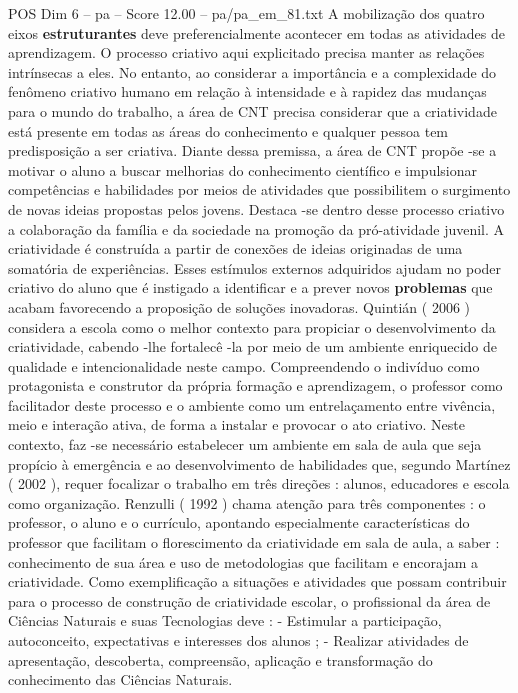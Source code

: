 \begin{textsample}{POS Dim 6 – pa – Score 12.00 – pa/pa\_em\_81.txt}
A mobilização dos quatro eixos \textbf{estruturantes} deve preferencialmente acontecer em todas as atividades de aprendizagem.
O processo criativo aqui explicitado precisa manter as relações intrínsecas a eles.
No entanto, ao considerar a importância e a complexidade do fenômeno criativo humano em relação à intensidade e à rapidez das mudanças para o mundo do trabalho, a área de CNT precisa considerar que a criatividade está presente em todas as áreas do conhecimento e qualquer pessoa tem predisposição a ser criativa.
Diante dessa premissa, a área de CNT propõe -se a motivar o aluno a buscar melhorias do conhecimento científico e impulsionar competências e habilidades por meios de atividades que possibilitem o surgimento de novas ideias propostas pelos jovens.
Destaca -se dentro desse processo criativo a colaboração da família e da sociedade na promoção da pró-atividade juvenil.
A criatividade é construída a partir de conexões de ideias originadas de uma somatória de experiências.
Esses estímulos externos adquiridos ajudam no poder criativo do aluno que é instigado a identificar e a prever novos \textbf{problemas} que acabam favorecendo a proposição de soluções inovadoras.
Quintián ( 2006 ) considera a escola como o melhor contexto para propiciar o desenvolvimento da criatividade, cabendo -lhe fortalecê -la por meio de um ambiente enriquecido de qualidade e intencionalidade neste campo.
Compreendendo o indivíduo como protagonista e construtor da própria formação e aprendizagem, o professor como facilitador deste processo e o ambiente como um entrelaçamento entre vivência, meio e interação ativa, de forma a instalar e provocar o ato criativo.
Neste contexto, faz -se necessário estabelecer um ambiente em sala de aula que seja propício à emergência e ao desenvolvimento de habilidades que, segundo Martínez ( 2002 ), requer focalizar o trabalho em três direções : alunos, educadores e escola como organização.
Renzulli ( 1992 ) chama atenção para três componentes : o professor, o aluno e o currículo, apontando especialmente características do professor que facilitam o florescimento da criatividade em sala de aula, a saber : conhecimento de sua área e uso de metodologias que facilitam e encorajam a criatividade.
Como exemplificação a situações e atividades que possam contribuir para o processo de construção de criatividade escolar, o profissional da área de Ciências Naturais e suas Tecnologias deve : - Estimular a participação, autoconceito, expectativas e interesses dos alunos ; - Realizar atividades de apresentação, descoberta, compreensão, aplicação e transformação do conhecimento das Ciências Naturais.

\end{textsample}
